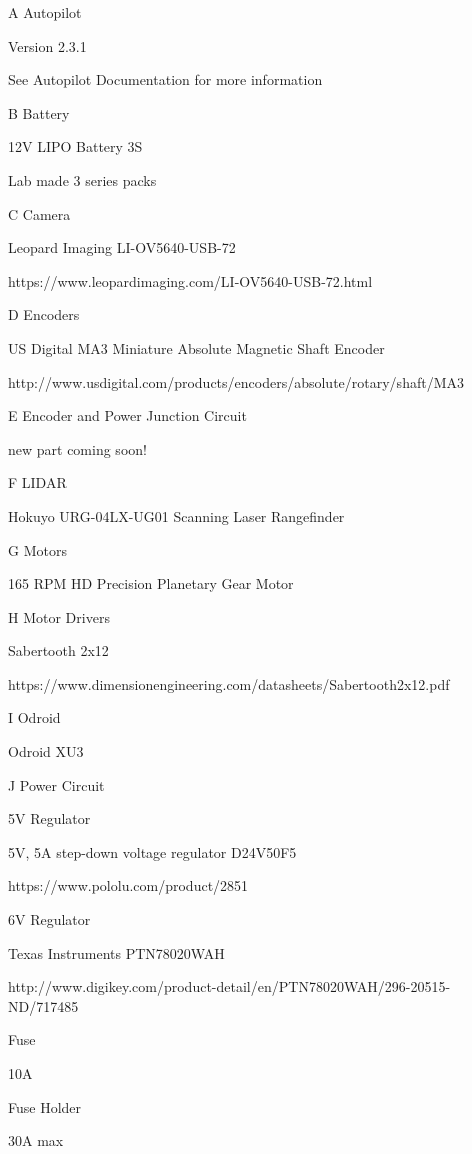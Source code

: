 \documentclass[letterpaper,12pt]{report}
\begin{document}
A Autopilot \par
\setlength{\parindent}{5ex}
Version 2.3.1 \par
See Autopilot Documentation for more information \par
\noindent
B Battery \par
12V LIPO Battery 3S \par
Lab made 3 series packs	\par
\noindent
C Camera \par
Leopard Imaging LI-OV5640-USB-72 \par
https://www.leopardimaging.com/LI-OV5640-USB-72.html \par
\noindent
D Encoders \par
US Digital MA3 Miniature Absolute Magnetic Shaft Encoder \par
http://www.usdigital.com/products/encoders/absolute/rotary/shaft/MA3 \par	
\noindent
E Encoder and Power Junction Circuit \par
new part coming soon! \par
\noindent
F LIDAR \par
Hokuyo URG-04LX-UG01 Scanning Laser Rangefinder \par
\noindent
G Motors \par
165 RPM HD Precision Planetary Gear Motor \par
\noindent	
H Motor Drivers \par
Sabertooth 2x12 \par
https://www.dimensionengineering.com/datasheets/Sabertooth2x12.pdf \par
\noindent	
I Odroid \par
Odroid XU3 \par
\noindent	
J Power Circuit \par
5V Regulator \par
\setlength{\parindent}{10ex}
5V, 5A step-down voltage regulator D24V50F5 \par
https://www.pololu.com/product/2851 \par
\setlength{\parindent}{5ex}
6V Regulator \par
\setlength{\parindent}{10ex}
Texas Instruments PTN78020WAH \par
http://www.digikey.com/product-detail/en/PTN78020WAH/296-20515-ND/717485 \par
\noindent		 
Fuse \par
\setlength{\parindent}{5ex}
10A \par 
\noindent	
Fuse Holder \par
30A max \par
\end{document}
